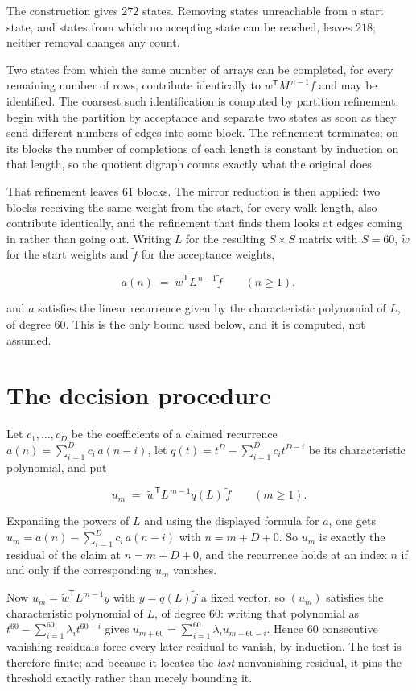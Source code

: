 \documentclass[11pt]{article}
\theoremstyle{definition}
\begin{document}
The construction gives $272$ states. Removing states unreachable from a start state, and states from which no accepting state can be reached, leaves $218$; neither removal changes any count.

Two states from which the same number of arrays can be completed, for every remaining number of rows, contribute identically to $w^{\mathsf T}M^{\,n-1}f$ and may be identified. The coarsest such identification is computed by partition refinement: begin with the partition by acceptance and separate two states as soon as they send different numbers of edges into some block. The refinement terminates; on its blocks the number of completions of each length is constant by induction on that length, so the quotient digraph counts exactly what the original does.

That refinement leaves $61$ blocks. The mirror reduction is then applied: two blocks receiving the same weight from the start, for every walk length, also contribute identically, and the refinement that finds them looks at edges coming in rather than going out. Writing $L$ for the resulting $S \times S$ matrix with $S = 60$, $\tilde w$ for the start weights and $\tilde f$ for the acceptance weights,

\[a(n) \;=\; \tilde w^{\mathsf T} L^{\,n-1} \tilde f \qquad (n \ge 1),\]

and $a$ satisfies the linear recurrence given by the characteristic polynomial of $L$, of degree $60$. This is the only bound used below, and it is computed, not assumed.

\section{The decision procedure}

Let $c_1,\dots,c_D$ be the coefficients of a claimed recurrence $a(n) = \sum_{i=1}^{D} c_i\,a(n-i)$, let $q(t) = t^{D} - \sum_{i=1}^{D} c_i t^{D-i}$ be its characteristic polynomial, and put

\[u_m \;=\; \tilde w^{\mathsf T} L^{\,m-1} q(L)\,\tilde f \qquad (m \ge 1).\]

Expanding the powers of $L$ and using the displayed formula for $a$, one gets $u_m = a(n) - \sum_{i=1}^{D} c_i\,a(n-i)$ with $n = m + D + 0$. So $u_m$ is exactly the residual of the claim at $n = m + D + 0$, and the recurrence holds at an index $n$ if and only if the corresponding $u_m$ vanishes.

Now $u_m = \tilde w^{\mathsf T} L^{m-1} y$ with $y = q(L)\tilde f$ a fixed vector, so $(u_m)$ satisfies the characteristic polynomial of $L$, of degree $60$: writing that polynomial as $t^{60} - \sum_{i=1}^{60} \lambda_i t^{60-i}$ gives $u_{m+60} = \sum_{i=1}^{60} \lambda_i u_{m+60-i}$. Hence $60$ consecutive vanishing residuals force every later residual to vanish, by induction. The test is therefore finite; and because it locates the {\itshape last} nonvanishing residual, it pins the threshold exactly rather than merely bounding it.
\end{document}
